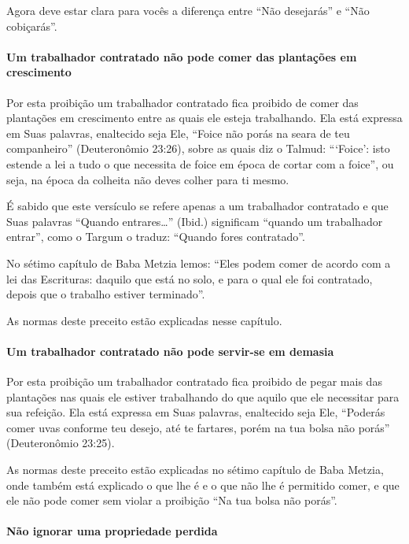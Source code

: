 Agora deve estar clara para vocês a diferença entre ``Não desejarás'' e
``Não cobiçarás''.

\paragraph{Um trabalhador contratado não pode comer das plantações em crescimento}

Por esta proibição um trabalhador contratado fica proibido de comer das
plantações em crescimento entre as quais ele esteja trabalhando. Ela
está expressa em Suas palavras, enaltecido seja Ele, ``Foice não porás
na seara de teu companheiro'' (Deuteronômio 23:26), sobre as quais diz o
Talmud: ```Foice': isto estende a lei a tudo o que necessita de foice
em época de cortar com a foice'', ou seja, na época da colheita não
deves colher para ti mesmo.

É sabido que este versículo se refere apenas a um trabalhador contratado e que Suas palavras ``Quando entrares\ldots{}'' (Ibid.) significam ``quando
um trabalhador entrar'', como o Targum o traduz: ``Quando fores
contratado''.

No sétimo capítulo de Baba Metzia lemos: ``Eles podem comer de acordo
com a lei das Escrituras: daquilo que está no solo, e para o qual ele
foi contratado, depois que o trabalho estiver terminado''.

As normas deste preceito estão explicadas nesse capítulo.

\paragraph{Um trabalhador contratado não pode servir-se em demasia}

Por esta proibição um trabalhador contratado fica proibido de pegar
mais das plantações nas quais ele estiver trabalhando do que aquilo que
ele necessitar para sua refeição. Ela está expressa em Suas palavras,
enaltecido seja Ele, ``Poderás comer uvas conforme teu desejo, até te
fartares, porém na tua bolsa não porás'' (Deuteronômio 23:25).

As normas deste preceito estão explicadas no sétimo capítulo de Baba
Metzia, onde também está explicado o que lhe é e o que não lhe é
permitido comer, e que ele não pode comer sem violar a proibição ``Na
tua bolsa não porás''.

\paragraph{Não ignorar uma propriedade perdida}


